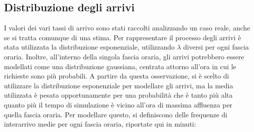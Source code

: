 \documentclass[a4paper, 12pt]{article}
\begin{document}
\subsection{Distribuzione degli arrivi}
I valori dei vari tassi di arrivo sono stati raccolti analizzando un caso reale, anche se si tratta comunque di una stima. Per rappresentare il processo degli arrivi è stata utilizzata la distribuzione esponenziale, utilizzando $\lambda$ diversi per ogni fascia oraria. Inoltre, all'interno della singola fascia oraria, gli arrivi potrebbero essere modellati come una distribuzione gaussiana, centrata attorno all'ora in cui le richieste sono più probabili. A partire da questa osservazione, si è scelto di utilizzare la distribuzione esponenziale per modellare gli arrivi, ma la media utilizzata è pesata opportunamente per una probabilità che è tanto più alta quanto più il tempo di simulazione è vicino all'ora di massima affluenza per quella fascia oraria. Per modellare questo, si definiscono delle frequenze di interarrivo medie per ogni fascia oraria, riportate qui in minuti:
\bigskip
\end{document}
